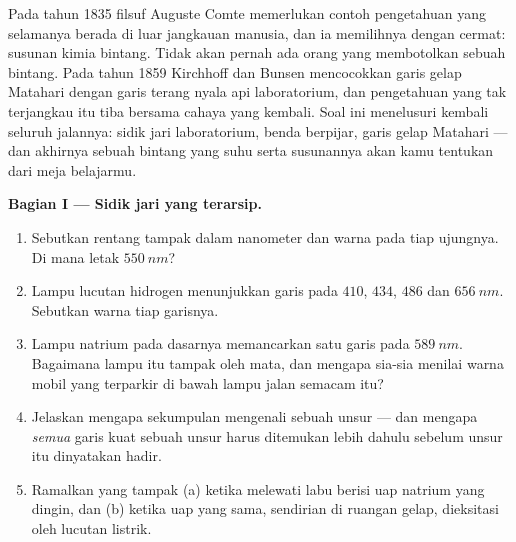 \begin{problem}
\label{pb:g10:light-spectra:1}
Pada tahun 1835 filsuf Auguste Comte memerlukan contoh pengetahuan yang
selamanya berada di luar jangkauan manusia, dan ia memilihnya dengan
cermat: susunan kimia bintang. Tidak akan pernah ada orang yang
membotolkan sebuah bintang. Pada tahun 1859 Kirchhoff dan Bunsen
mencocokkan garis gelap Matahari dengan garis terang nyala api
laboratorium, dan pengetahuan yang tak terjangkau itu tiba bersama
cahaya yang kembali. Soal ini menelusuri kembali seluruh jalannya:
sidik jari laboratorium, benda berpijar, garis gelap Matahari --- dan
akhirnya sebuah bintang yang suhu serta susunannya akan kamu tentukan
dari meja belajarmu.

\medskip
\noindent\textbf{Bagian I --- Sidik jari yang terarsip.}
\begin{enumerate}
  \item Sebutkan rentang  tampak dalam nanometer dan
        warna pada tiap ujungnya. Di mana letak $\qty{550}{nm}$?
  \item Lampu lucutan hidrogen menunjukkan garis pada $410$, $434$,
        $486$ dan $\qty{656}{nm}$. Sebutkan warna tiap garisnya.
  \item Lampu natrium pada dasarnya memancarkan satu garis pada
        $\qty{589}{nm}$. Bagaimana lampu itu tampak oleh mata, dan
        mengapa sia-sia menilai warna mobil yang terparkir di bawah
        lampu jalan semacam itu?
  \item Jelaskan mengapa sekumpulan  mengenali sebuah
        unsur --- dan mengapa \emph{semua} garis kuat sebuah unsur
        harus ditemukan lebih dahulu sebelum unsur itu dinyatakan
        hadir.
  \item Ramalkan  yang tampak (a) ketika  melewati
        labu berisi uap natrium yang dingin, dan (b) ketika uap yang
        sama, sendirian di ruangan gelap, dieksitasi oleh lucutan
        listrik.
\end{enumerate}


\end{problem}
